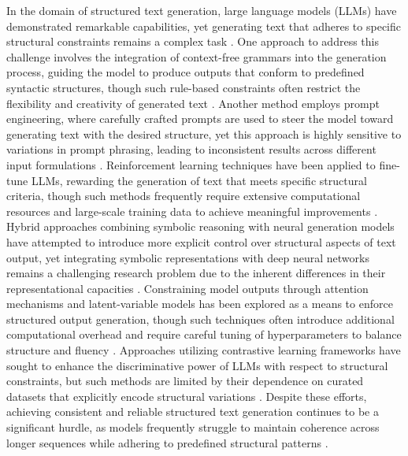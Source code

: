 \documentclass{article}
\begin{document}
In the domain of structured text generation, large language models (LLMs) have demonstrated remarkable capabilities, yet generating text that adheres to specific structural constraints remains a complex task \cite{satterfield2024fine,chen2024dynamic}. One approach to address this challenge involves the integration of context-free grammars into the generation process, guiding the model to produce outputs that conform to predefined syntactic structures, though such rule-based constraints often restrict the flexibility and creativity of generated text \cite{ilse2024comparative}. Another method employs prompt engineering, where carefully crafted prompts are used to steer the model toward generating text with the desired structure, yet this approach is highly sensitive to variations in prompt phrasing, leading to inconsistent results across different input formulations \cite{liu2024personalised,ashger2024contextual}. Reinforcement learning techniques have been applied to fine-tune LLMs, rewarding the generation of text that meets specific structural criteria, though such methods frequently require extensive computational resources and large-scale training data to achieve meaningful improvements \cite{mcintosh2024inadequacies}. Hybrid approaches combining symbolic reasoning with neural generation models have attempted to introduce more explicit control over structural aspects of text output, yet integrating symbolic representations with deep neural networks remains a challenging research problem due to the inherent differences in their representational capacities \cite{bennet2024new}. Constraining model outputs through attention mechanisms and latent-variable models has been explored as a means to enforce structured output generation, though such techniques often introduce additional computational overhead and require careful tuning of hyperparameters to balance structure and fluency \cite{kaleigha2024optimized}. Approaches utilizing contrastive learning frameworks have sought to enhance the discriminative power of LLMs with respect to structural constraints, but such methods are limited by their dependence on curated datasets that explicitly encode structural variations \cite{taillieu2024dynamic,nesbitt2024semantic}. Despite these efforts, achieving consistent and reliable structured text generation continues to be a significant hurdle, as models frequently struggle to maintain coherence across longer sequences while adhering to predefined structural patterns \cite{zollner2024technical}.
\end{document}

